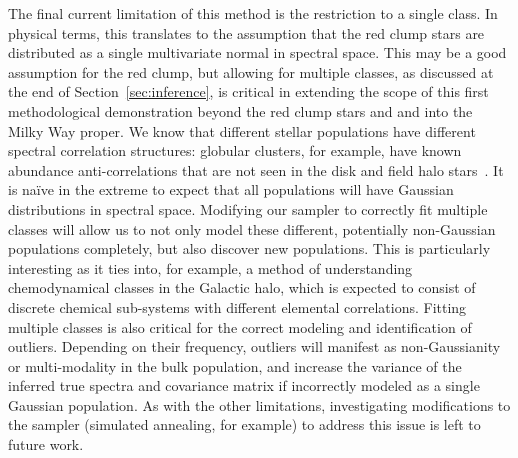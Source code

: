 \documentclass[a4paper,fleqn,usenatbib]{mnras}
\newcommand{\mkn}[1]{\textbf{\textcolor{red}{MKN: #1}}}
\begin{document}
The final current limitation of this method is the restriction to a single class. In physical terms, this translates to the assumption that the red clump stars are distributed as a single multivariate normal in spectral space. This may be a good assumption for the red clump, but allowing for multiple classes, as discussed at the end of Section~\ref{sec:inference}, is critical in extending the scope of this first methodological demonstration beyond the red clump stars and and into the Milky Way proper. We know that different stellar populations have different spectral correlation structures: globular clusters, for example, have known abundance anti-correlations that are not seen in the disk and field halo stars~\citep[e.g.,][]{Kraft1997,Gratton2015, Pan2017,Carr2019}. It is na\"ive in the extreme to expect that all populations will have Gaussian distributions in spectral space. Modifying our sampler to correctly fit multiple classes will allow us to not only model these different, potentially non-Gaussian populations completely, but also discover new populations. This is particularly interesting as it ties into, for example, a method of understanding chemodynamical classes in the Galactic halo, which is expected to consist of discrete chemical sub-systems with different elemental correlations. Fitting multiple classes is also critical for the correct modeling and identification of outliers. Depending on their frequency, outliers will manifest as non-Gaussianity or multi-modality in the bulk population, and increase the variance of the inferred true spectra and covariance matrix if incorrectly modeled as a single Gaussian population. As with the other limitations, investigating modifications to the sampler (simulated annealing, for example) to address this issue is left to future work.

 
\end{document}
